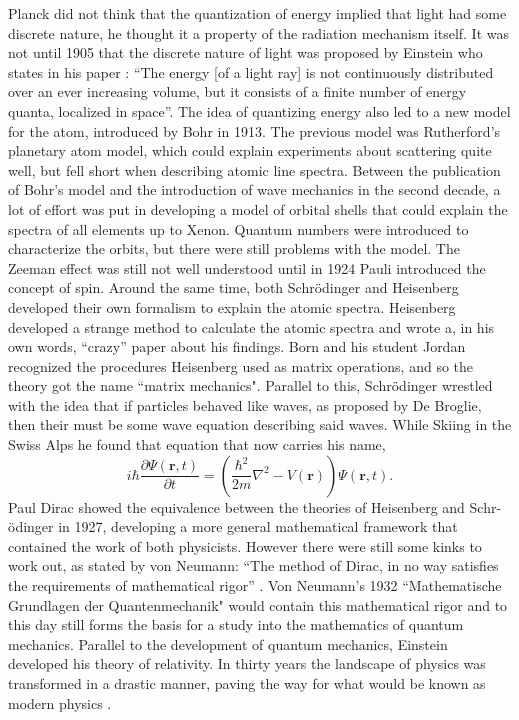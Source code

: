 Planck did not think that the quantization of energy implied that light had some discrete nature, he thought it a property of the radiation mechanism itself. It was not until 1905 that the discrete nature of light was proposed by Einstein who states in his paper \cite{Einstein1905}:  ``The energy [of a light ray] is not continuously distributed over an ever increasing volume, but it consists of a finite number of energy quanta, localized in space''. The idea of quantizing energy also led to a new model for the atom, introduced by Bohr in 1913. The previous model was Rutherford's planetary atom model, which could explain experiments about scattering quite well, but fell short when describing atomic line spectra. Between the publication of Bohr's model and the introduction of wave mechanics in the second decade, a lot of effort was put in developing a model of orbital shells that could explain the spectra of all elements up to Xenon. Quantum numbers were introduced to characterize the orbits, but there were still problems with the model. The Zeeman effect was still not well understood until in 1924 Pauli introduced the concept of spin. Around the same time, both Schr\"odinger and Heisenberg developed their own formalism to explain the atomic spectra. Heisenberg developed a strange method to calculate the atomic spectra and wrote a, in his own words, ``crazy'' paper about his findings. Born and his student Jordan recognized the procedures Heisenberg used as matrix operations, and so the theory got the name ``matrix mechanics". Parallel to this, Schr\"odinger wrestled with the idea that if particles behaved like waves, as proposed by De Broglie, then their must be some wave equation describing said waves. While Skiing in the Swiss Alps he found that equation that now carries his name,
\begin{equation*}
    i \hbar \frac{\partial \Psi(\mathbf{r},t)}{\partial t} = \left( \frac{\hbar^2}{2m} \nabla^2 - V(\mathbf{r}) \right) \Psi(\mathbf{r},t).
\end{equation*}
Paul Dirac showed the equivalence between the theories of Heisenberg and Schr- \"odinger in 1927, developing a more general mathematical framework that contained the work of both physicists. However there were still some kinks to work out, as stated by von Neumann: ``The method of Dirac, in no way satisfies the requirements of mathematical rigor'' \cite{Neumann1932}. Von Neumann's 1932 ``Mathematische Grundlagen der Quantenmechanik" would contain this mathematical rigor and to this day still forms the basis for a study into the mathematics of quantum mechanics. Parallel to the development of quantum mechanics, Einstein developed his theory of relativity. In thirty years the landscape of physics was transformed in a drastic manner, paving the way for what would be known as modern physics \cite{Cramer2016, terHaar1967}. 
\clearpage

